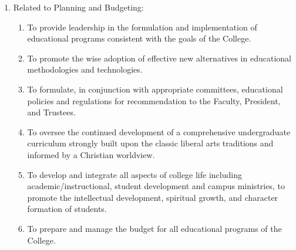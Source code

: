 \documentclass[letterpaper, 11pt]{article}
\newcounter{subsubparagraph}
\begin{document}
\begin{enumerate}[label=\alph*)]
{\begin{enumerate}[label=\arabic*)]
{\begin{enumerate}[label=(\alph*)]
{\begin{enumerate}[label=(\arabic*)]
											\end{enumerate}
										}
										\item{To serve ex officio on College committees and to chair the following:
											\begin{enumerate}[label=(\arabic*)]
												\item{Faculty meeting as a committee of the whole}
												\item{Academic Senate}
												\item{and to establish ad hoc committees as may be appropriate}
											\end{enumerate}
										}
									\end{enumerate}
								}
								\item{Related to Planning and Budgeting:
									\begin{enumerate}[label=(\arabic*)]
										\item{To provide leadership in the formulation and implementation of educational programs consistent with the goals of the College.}
										\item{To promote the wise adoption of effective new alternatives in educational methodologies and technologies.}
										\item{To formulate, in conjunction with appropriate committees, educational policies and regulations for recommendation to the Faculty, President, and Trustees.}
										\item{To oversee the continued development of a comprehensive undergraduate curriculum strongly built upon the classic liberal arts traditions and informed by a Christian worldview.}
										\item{To develop and integrate all aspects of college life including academic/instructional, student development and campus ministries, to promote the intellectual development, spiritual growth, and character formation of students.}
										\item{To prepare and manage the budget for all educational programs of the College.}
									\end{enumerate}
								}
							\end{enumerate}
						}
					\end{enumerate}
\end{document}
